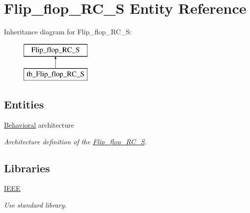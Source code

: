 \hypertarget{class_flip__flop___r_c___s}{}\section{Flip\+\_\+flop\+\_\+\+R\+C\+\_\+S Entity Reference}
\label{class_flip__flop___r_c___s}
Inheritance diagram for Flip\+\_\+flop\+\_\+\+R\+C\+\_\+S\+:\begin{figure}[H]
\begin{center}
\leavevmode
\includegraphics[height=2.000000cm]{class_flip__flop___r_c___s}
\end{center}
\end{figure}
\subsection*{Entities}
\begin{DoxyCompactItemize}
\item 
\hyperlink{class_flip__flop___r_c___s_1_1_behavioral}{Behavioral} architecture
\begin{DoxyCompactList}\small\item\em Architecture definition of the \hyperlink{class_flip__flop___r_c___s}{Flip\+\_\+flop\+\_\+\+R\+C\+\_\+S}. \end{DoxyCompactList}\end{DoxyCompactItemize}
\subsection*{Libraries}
 \begin{DoxyCompactItemize}
\item 
\hyperlink{class_flip__flop___r_c___s_ae4f03c286607f3181e16b9aa12d0c6d4}{I\+E\+EE} \hypertarget{class_flip__flop___r_c___s_ae4f03c286607f3181e16b9aa12d0c6d4}{}\label{class_flip__flop___r_c___s_ae4f03c286607f3181e16b9aa12d0c6d4}

\begin{DoxyCompactList}\small\item\em Use standard library. \end{DoxyCompactList}\end{DoxyCompactItemize}
